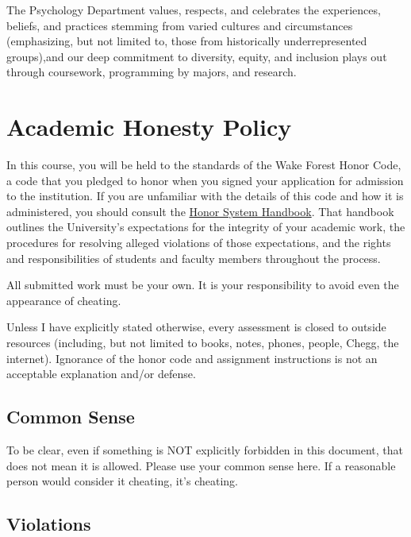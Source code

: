 The Psychology Department values, respects, and celebrates the experiences, beliefs, and practices stemming from varied cultures and circumstances (emphasizing, but not limited to, those from historically underrepresented groups),and our deep commitment to diversity, equity, and inclusion plays out through coursework, programming by majors, and research.

\hypertarget{academic-honesty-policy}{%
\chapter{Academic Honesty Policy}\label{academic-honesty-policy}}

In this course, you will be held to the standards of the Wake Forest Honor Code, a code that you pledged to honor when you signed your application for admission to the institution.
If you are unfamiliar with the details of this code and how it is administered, you should consult the \href{https://studentconduct.wfu.edu/honor-system-wfu/}{Honor System Handbook}.
That handbook outlines the University's expectations for the integrity of your academic work, the procedures for resolving alleged violations of those expectations, and the rights and responsibilities of students and faculty members throughout the process.

All submitted work must be your own. It is your responsibility to avoid even the appearance of cheating.

Unless I have explicitly stated otherwise, every assessment is closed to outside resources (including, but not limited to books, notes, phones, people, Chegg, the internet).
Ignorance of the honor code and assignment instructions is not an acceptable explanation and/or defense.

\hypertarget{common-sense}{%
\section{Common Sense}\label{common-sense}}

To be clear, even if something is NOT explicitly forbidden in this document, that does not mean it is allowed. Please use your common sense here. If a reasonable person would consider it cheating, it's cheating.

\hypertarget{violations}{%
\section{Violations}\label{violations}}

